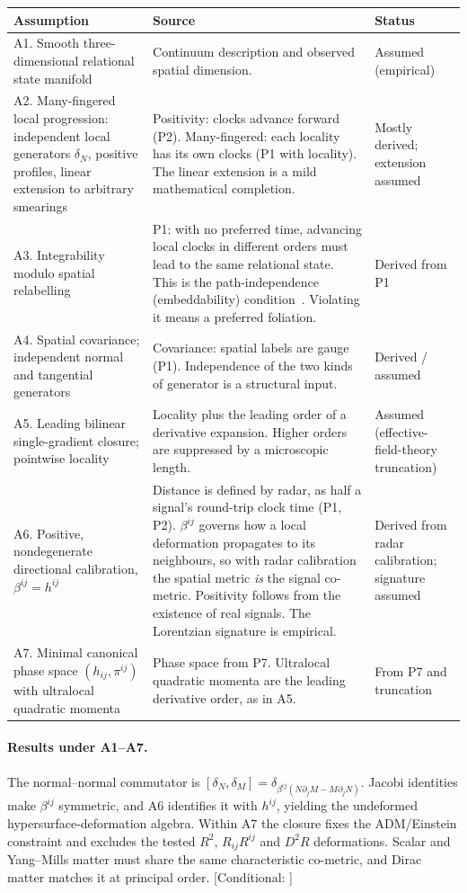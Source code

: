 \documentclass[11pt]{article}
\newcommand{\st}[1]{\textsf{\small[#1]}}
\theoremstyle{plain}
\theoremstyle{definition}
\theoremstyle{remark}
\begin{document}
\begin{longtable}{@{}>{\raggedright\arraybackslash}p{}>{\raggedright\arraybackslash}p{}>{\raggedright\arraybackslash}p{}@{}}
\toprule
Assumption & Source & Status \\
\midrule
A1. Smooth three-dimensional relational state manifold & Continuum description and observed spatial dimension. & Assumed (empirical) \\
A2. Many-fingered local progression: independent local generators $\delta_N$, positive profiles, linear extension to arbitrary smearings & Positivity: clocks advance forward (P2). Many-fingered: each locality has its own clocks (P1 with locality). The linear extension is a mild mathematical completion. & Mostly derived; extension assumed \\
A3. Integrability modulo spatial relabelling & P1: with no preferred time, advancing local clocks in different orders must lead to the same relational state. This is the path-independence (embeddability) condition~\cite{Teitelboim1973,HKT1976}. Violating it means a preferred foliation. & Derived from P1 \\
A4. Spatial covariance; independent normal and tangential generators & Covariance: spatial labels are gauge (P1). Independence of the two kinds of generator is a structural input. & Derived / assumed \\
A5. Leading bilinear single-gradient closure; pointwise locality & Locality plus the leading order of a derivative expansion. Higher orders are suppressed by a microscopic length. & Assumed (effective-field-theory truncation) \\
A6. Positive, nondegenerate directional calibration, $\beta^{ij}=h^{ij}$ & Distance is defined by radar, as half a signal's round-trip clock time (P1, P2). $\beta^{ij}$ governs how a local deformation propagates to its neighbours, so with radar calibration the spatial metric \emph{is} the signal co-metric. Positivity follows from the existence of real signals. The Lorentzian signature is empirical. & Derived from radar calibration; signature assumed \\
A7. Minimal canonical phase space $(h_{ij},\pi^{ij})$ with ultralocal quadratic momenta & Phase space from P7. Ultralocal quadratic momenta are the leading derivative order, as in A5. & From P7 and truncation \\
\bottomrule
\end{longtable}

\paragraph{Results under A1--A7.}
The normal--normal commutator is $[\delta_N,\delta_M]=\delta_{\beta^{ij}(N\partial_jM-M\partial_jN)}$. Jacobi identities make $\beta^{ij}$ symmetric, and A6 identifies it with $h^{ij}$, yielding the undeformed hypersurface-deformation algebra. Within A7 the closure fixes the ADM/Einstein constraint and excludes the tested $R^2$, $R_{ij}R^{ij}$ and $D^2R$ deformations. Scalar and Yang--Mills matter must share the same characteristic co-metric, and Dirac matter matches it at principal order. \st{Conditional: \cite{JordanHDA}}
\end{document}
